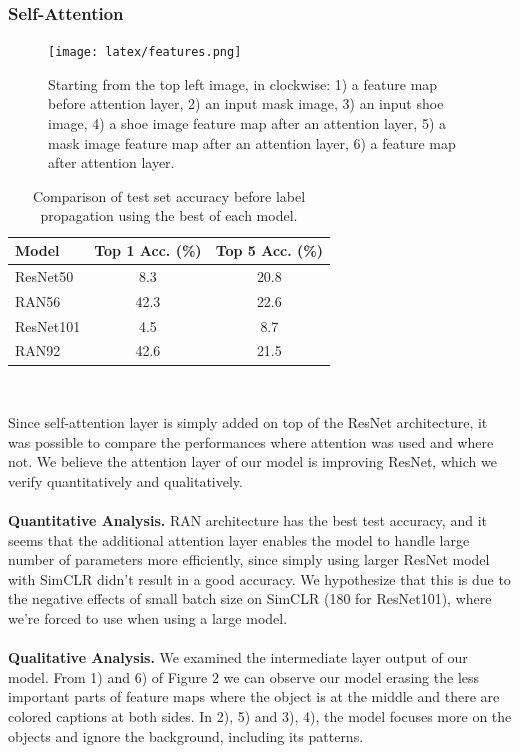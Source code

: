 \documentclass[10pt,twocolumn,letterpaper]{article}
\begin{document}
	\subsubsection{Self-Attention}
	\begin{figure}
		\centering
		\texttt{[image: latex/features.png]}
		\label{fig:features}
		\caption{Starting from the top left image, in clockwise: 1) a feature map before attention layer, 2) an input mask image, 3) an input shoe image, 4) a shoe image feature map after an attention layer, 5) a mask image feature map after an attention layer, 6) a feature map after attention layer.}
	\end{figure}
	\begin{table}
		\centering
		\label{table:RANvsResNet}
		\begin{tabular}{ ||p{1.45cm}|c c||  }
			\hline
			Model & Top 1 Acc. (\%) & Top 5 Acc. (\%)\\
			\hline
			ResNet50&  8.3 & 20.8  \\
			RAN56&  42.3 & 22.6  \\
			ResNet101&  4.5 & 8.7  \\
			RAN92&  42.6 & 21.5  \\
			\hline
		\end{tabular} \\ [1ex]
		\caption{Comparison of test set accuracy before label propagation using the best of each model.}
	\end{table}
	Since self-attention layer is simply added on top of the ResNet architecture, it was possible to compare the performances where attention was used and where not. We believe the attention layer of our model is improving ResNet, which we verify quantitatively and qualitatively.\\\\ \textbf{Quantitative Analysis.} RAN architecture has the best test accuracy, and it seems that the additional attention layer enables the model to handle large number of parameters more efficiently, since simply using larger ResNet model with SimCLR didn't result in a good accuracy. We hypothesize that this is due to the negative effects of small batch size on SimCLR (180 for ResNet101), where we're forced to use when using a large model. \\\\
	\textbf{Qualitative Analysis.} We examined the intermediate layer output of our model. From 1) and 6) of Figure $2$ we can observe our model erasing the less important parts of feature maps where the object is at the middle and there are colored captions at both sides. In 2), 5) and 3), 4), the model focuses more on the objects and ignore the background, including its patterns. 
	
\end{document}
